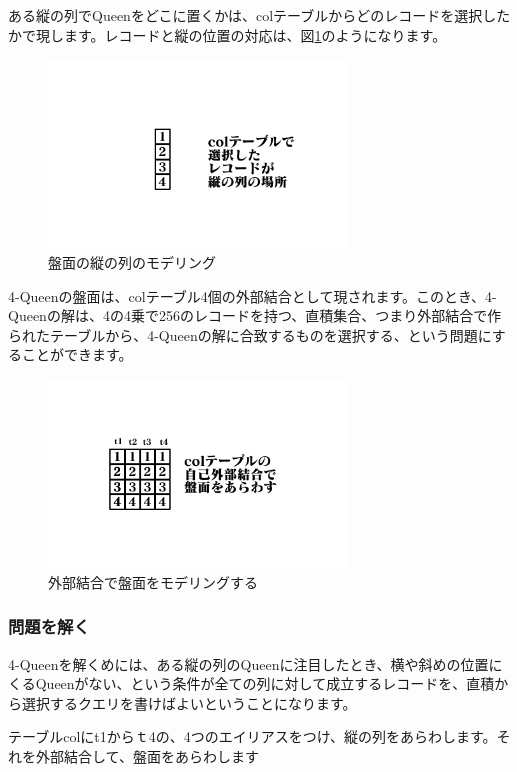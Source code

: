 ある縦の列でQueenをどこに置くかは、colテーブルからどのレコードを選択したかで現します。レコードと縦の位置の対応は、図\ref{fig:column}のようになります。

\begin{figure}[htbp]
  \includegraphics[width=8cm,pagebox=cropbox]{draw/4queen-1.pdf}
  \caption{盤面の縦の列のモデリング}
  \label{fig:column}
\end{figure}


4-Queenの盤面は、colテーブル4個の外部結合として現されます。このとき、4-Queenの解は、4の4乗で256のレコードを持つ、直積集合、つまり外部結合で作られたテーブルから、4-Queenの解に合致するものを選択する、という問題にすることができます。

\begin{figure}[htbp]
  \includegraphics[width=8cm,pagebox=cropbox]{draw/4queen-2.pdf}
  \caption{外部結合で盤面をモデリングする}
  \label{fig:board}
\end{figure}

\subsubsection{問題を解く}

4-Queenを解くめには、ある縦の列のQueenに注目したとき、横や斜めの位置にくるQueenがない、という条件が全ての列に対して成立するレコードを、直積から選択するクエリを書けばよいということになります。

テーブルcolにt1からｔ4の、4つのエイリアスをつけ、縦の列をあらわします。それを外部結合して、盤面をあらわします

